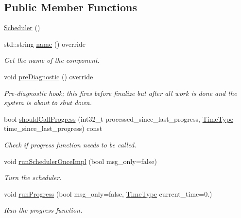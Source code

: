 \subsection*{Public Member Functions}
\begin{DoxyCompactItemize}
\item 
\hyperlink{structvt_1_1sched_1_1_scheduler_a54b61f09996bca1d5ed5332e1a4e2b60}{Scheduler} ()
\item 
std\+::string \hyperlink{structvt_1_1sched_1_1_scheduler_a60d76cb810df35be76d414226c24d6c4}{name} () override
\begin{DoxyCompactList}\small\item\em Get the name of the component. \end{DoxyCompactList}\item 
void \hyperlink{structvt_1_1sched_1_1_scheduler_a42835a58f541dd65cecd4d393fe78a81}{pre\+Diagnostic} () override
\begin{DoxyCompactList}\small\item\em Pre-\/diagnostic hook; this fires before finalize but after all work is done and the system is about to shut down. \end{DoxyCompactList}\item 
bool \hyperlink{structvt_1_1sched_1_1_scheduler_aa1e901f6264aa52d918f4c64802e54b5}{should\+Call\+Progress} (int32\+\_\+t processed\+\_\+since\+\_\+last\+\_\+progress, \hyperlink{namespacevt_a876a9d0cd5a952859c72de8a46881442}{Time\+Type} time\+\_\+since\+\_\+last\+\_\+progress) const
\begin{DoxyCompactList}\small\item\em Check if progress function needs to be called. \end{DoxyCompactList}\item 
void \hyperlink{structvt_1_1sched_1_1_scheduler_a991208100bd8be482164303b7d8135ad}{run\+Scheduler\+Once\+Impl} (bool msg\+\_\+only=false)
\begin{DoxyCompactList}\small\item\em Turn the scheduler. \end{DoxyCompactList}\item 
void \hyperlink{structvt_1_1sched_1_1_scheduler_a10a319d456d171d75b3d83c5f621dacb}{run\+Progress} (bool msg\+\_\+only=false, \hyperlink{namespacevt_a876a9d0cd5a952859c72de8a46881442}{Time\+Type} current\+\_\+time=0.)
\begin{DoxyCompactList}\small\item\em Run the progress function. \end{DoxyCompactList}\item 

\end{DoxyCompactItemize}
